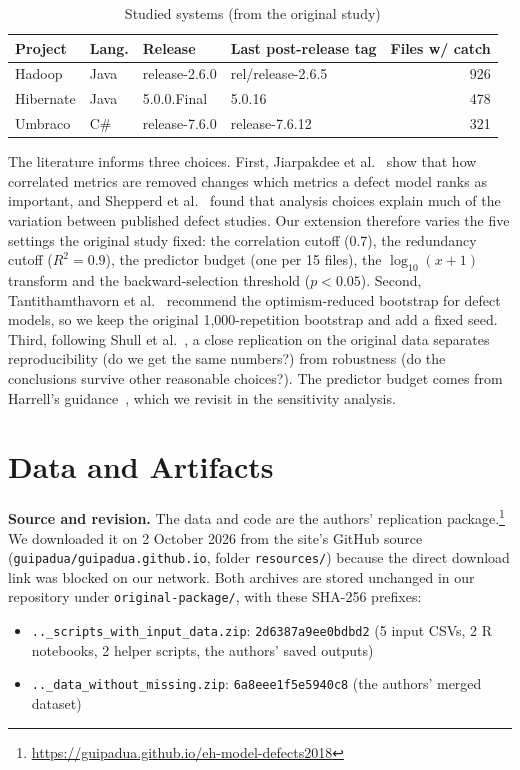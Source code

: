 \documentclass[conference]{IEEEtran}
\begin{document}
\begin{table}[!h]
\centering
\caption{Studied systems (from the original study)}
\label{tab:systems}
\footnotesize
\begin{tabular}{@{}llll r@{}}
\toprule
Project & Lang. & Release & Last post-release tag & Files w/ catch \\
\midrule
Hadoop & Java & release-2.6.0 & rel/release-2.6.5 & 926 \\
Hibernate & Java & 5.0.0.Final & 5.0.16 & 478 \\
Umbraco & C\# & release-7.6.0 & release-7.6.12 & 321 \\
\bottomrule
\end{tabular}
\end{table}

The literature informs three choices. First, Jiarpakdee et al.~\cite{jiarpakdee2021tse} show that how correlated metrics are removed changes which metrics a defect model ranks as important, and Shepperd et al.~\cite{shepperd2014bias} found that analysis choices explain much of the variation between published defect studies. Our extension therefore varies the five settings the original study fixed: the correlation cutoff (0.7), the redundancy cutoff ($R^2 = 0.9$), the predictor budget (one per 15 files), the $\log_{10}(x+1)$ transform and the backward-selection threshold ($p < 0.05$). Second, Tantithamthavorn et al.~\cite{tantithamthavorn2017tse} recommend the optimism-reduced bootstrap for defect models, so we keep the original 1,000-repetition bootstrap and add a fixed seed. Third, following Shull et al.~\cite{shull2008replication}, a close replication on the original data separates reproducibility (do we get the same numbers?) from robustness (do the conclusions survive other reasonable choices?). The predictor budget comes from Harrell's guidance~\cite{harrell2015rms}, which we revisit in the sensitivity analysis.

\section{Data and Artifacts}
\textbf{Source and revision.} The data and code are the authors' replication package.\footnote{\url{https://guipadua.github.io/eh-model-defects2018}} We downloaded it on 2 October 2026 from the site's GitHub source (\texttt{guipadua/guipadua.github.io}, folder \texttt{resources/}) because the direct download link was blocked on our network. Both archives are stored unchanged in our repository under \texttt{original-package/}, with these SHA-256 prefixes:
\begin{itemize}
\item \texttt{..\_scripts\_with\_input\_data.zip}: \texttt{2d6387a9ee0bdbd2} (5 input CSVs, 2 R notebooks, 2 helper scripts, the authors' saved outputs)
\item \texttt{..\_data\_without\_missing.zip}: \texttt{6a8eee1f5e5940c8} (the authors' merged dataset)
\end{itemize}
\end{document}
